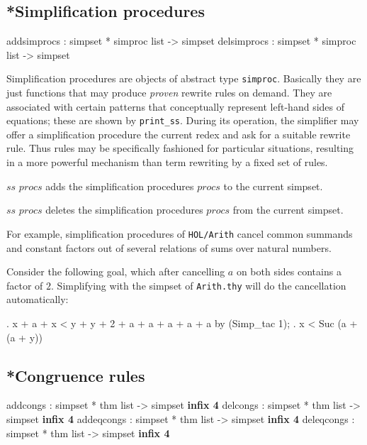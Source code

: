 \subsection{*Simplification procedures}
\begin{ttbox}
addsimprocs : simpset * simproc list -> simpset
delsimprocs : simpset * simproc list -> simpset
\end{ttbox}

Simplification procedures are {\ML} objects of abstract type
\texttt{simproc}.  Basically they are just functions that may produce
\emph{proven} rewrite rules on demand.  They are associated with
certain patterns that conceptually represent left-hand sides of
equations; these are shown by \texttt{print_ss}.  During its
operation, the simplifier may offer a simplification procedure the
current redex and ask for a suitable rewrite rule.  Thus rules may be
specifically fashioned for particular situations, resulting in a more
powerful mechanism than term rewriting by a fixed set of rules.


\begin{ttdescription}
  
\item[$ss$ \ttindexbold{addsimprocs} $procs$] adds the simplification
  procedures $procs$ to the current simpset.
  
\item[$ss$ \ttindexbold{delsimprocs} $procs$] deletes the simplification
  procedures $procs$ from the current simpset.

\end{ttdescription}

For example, simplification procedures  of
\texttt{HOL/Arith} cancel common summands and constant factors out of
several relations of sums over natural numbers.

Consider the following goal, which after cancelling $a$ on both sides
contains a factor of $2$.  Simplifying with the simpset of
\texttt{Arith.thy} will do the cancellation automatically:
\begin{ttbox}
{. x + a + x < y + y + 2 + a + a + a + a + a}
by (Simp_tac 1);
{. x < Suc (a + (a + y))}
\end{ttbox}


\subsection{*Congruence rules}\label{sec:simp-congs}
\begin{ttbox}
addcongs   : simpset * thm list -> simpset \hfill{\bf infix 4}
delcongs   : simpset * thm list -> simpset \hfill{\bf infix 4}
addeqcongs : simpset * thm list -> simpset \hfill{\bf infix 4}
deleqcongs : simpset * thm list -> simpset \hfill{\bf infix 4}
\end{ttbox}

